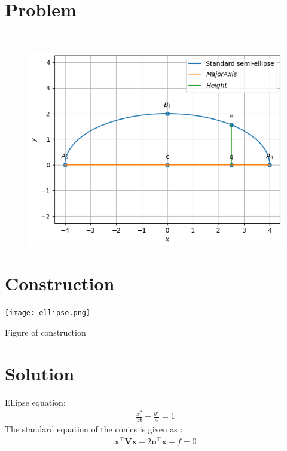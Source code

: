 \documentclass[10pt, a4paper]{article}
\title{\mytitle}
\author{\myauthor\hspace{1em}\\\contact\\FWC22011\hspace{6.5em}IITH\hspace{0.5em}\mymodule\hspace{6em}Matrix:conic}
\date{}
\let\vec\mathbf
\begin{document}
	\maketitle
	\tableofcontents
   \section{Problem}
   \fi
\\
\solution 
	\begin{figure}[!ht]
		\centering
 \includegraphics[width=\columnwidth]{chapters/11/11/5/4/figs/ellipse.png}
		\caption{}
		\label{fig:11/11/5/4}
  	\end{figure}
	\iffalse

\section{Construction}
  \texttt{[image: ellipse.png]}
  	\begin{center}
  Figure of construction
  	\end{center}
  \section{Solution}
Ellipse equation:
\begin{align}
\frac{x^2}{16}+\frac{y^2}{4}=1
\end{align}
The standard equation of the conics is given as :
\begin{align}
\vec{x}^{\top}\vec{V}\vec{x}+2\vec{u}^{\top}\vec{x}+f=0
\label{eq:conic}
\end{align}
\end{document}
